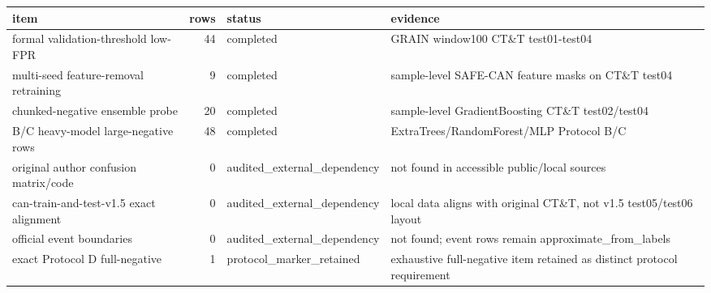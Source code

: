 \begin{tabular}{lrll}
\toprule
item & rows & status & evidence \\
\midrule
formal validation-threshold low-FPR & 44 & completed & GRAIN window100 CT\&T test01-test04 \\
multi-seed feature-removal retraining & 9 & completed & sample-level SAFE-CAN feature masks on CT\&T test04 \\
chunked-negative ensemble probe & 20 & completed & sample-level GradientBoosting CT\&T test02/test04 \\
B/C heavy-model large-negative rows & 48 & completed & ExtraTrees/RandomForest/MLP Protocol B/C \\
original author confusion matrix/code & 0 & audited\_external\_dependency & not found in accessible public/local sources \\
can-train-and-test-v1.5 exact alignment & 0 & audited\_external\_dependency & local data aligns with original CT\&T, not v1.5 test05/test06 layout \\
official event boundaries & 0 & audited\_external\_dependency & not found; event rows remain approximate\_from\_labels \\
exact Protocol D full-negative & 1 & protocol\_marker\_retained & exhaustive full-negative item retained as distinct protocol requirement \\
\bottomrule
\end{tabular}
